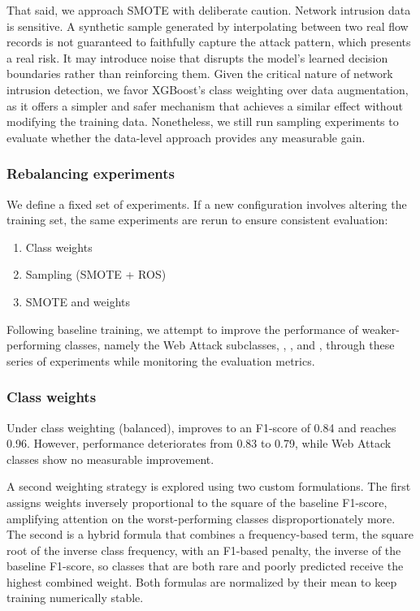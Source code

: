 That said, we approach SMOTE with deliberate caution. Network intrusion data is sensitive. A synthetic sample generated by interpolating between two real flow records is not guaranteed to faithfully capture the attack pattern, which presents a real risk. It may introduce noise that disrupts the model’s learned decision boundaries rather than reinforcing them.
Given the critical nature of network intrusion detection, we favor XGBoost’s class weighting over data augmentation, as it offers a simpler and safer mechanism that achieves a similar effect without modifying the training data. Nonetheless, we still run sampling experiments to evaluate whether the data-level approach provides any measurable gain.

\subsubsection{Rebalancing experiments}
We define a fixed set of experiments. If a new configuration involves altering the training set, the same experiments are rerun to ensure consistent evaluation:
\begin{enumerate}
    \item Class weights
    \item Sampling (SMOTE + ROS)
    \item SMOTE and weights
\end{enumerate}


Following baseline training, we attempt to improve the performance of weaker-performing classes, namely the Web Attack subclasses, , , and , through these series of experiments while monitoring the evaluation metrics.


\subsubsection{Class weights}

Under class weighting (balanced),  improves to an F1-score of 0.84 and  reaches 0.96. However,  performance deteriorates from 0.83 to 0.79, while Web Attack classes show no measurable improvement.

A second weighting strategy is explored using two custom formulations.
The first assigns weights inversely proportional to the square of the baseline F1-score, amplifying attention on the worst-performing classes disproportionately more.
The second is a hybrid formula that combines a frequency-based term, the square root of the inverse class frequency, with an F1-based penalty, the inverse of the baseline F1-score, so classes that are both rare and poorly predicted receive the highest combined weight.
Both formulas are normalized by their mean to keep training numerically stable.

